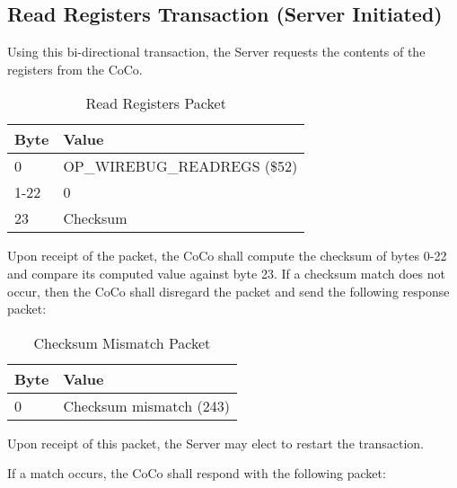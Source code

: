 \documentclass{article}
\begin{document}
\subsection{Read Registers Transaction (Server Initiated)}
Using this bi-directional transaction, the Server requests the contents of the registers from the CoCo.

\begin{table}[ht]
\caption{Read Registers Packet}
\begin{center}
\begin{tabular}{|ll|}
\hline
Byte & Value \\ \hline
0 & OP\_WIREBUG\_READREGS (\$52) \\
1-22 & 0 \\
23 & Checksum \\
\hline
\end{tabular}
\end{center}
\end{table}

Upon receipt of the packet, the CoCo shall compute the checksum of bytes 0-22 and compare its computed value against byte 23. If a checksum match does not occur, then the CoCo shall disregard the packet and send the following response packet:

\begin{table}[ht]
\caption{Checksum Mismatch Packet}
\begin{center}
\begin{tabular}{|ll|}
\hline
Byte & Value \\ \hline
0 & Checksum mismatch (243) \\
\hline
\end{tabular}
\end{center}
\end{table}

Upon receipt of this packet, the Server may elect to restart the transaction.

If a match occurs, the CoCo shall respond with the following packet:
\end{document}
